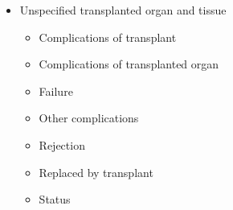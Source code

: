 \begin{itemize}
\begin{itemize}
        \item Unspecified transplanted organ and tissue
        \begin{itemize}
            \item Complications of transplant
            \item Complications of transplanted organ
            \item Failure
            \item Other complications
            \item Rejection
            \item Replaced by transplant
            \item Status
        \end{itemize}
    \end{itemize}
        
\end{itemize}